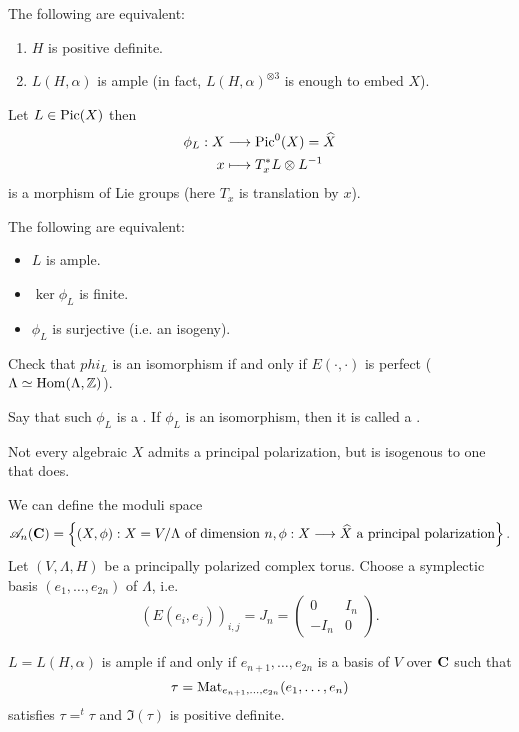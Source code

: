 \begin{theorem}[Lefschetz]
The following are equivalent:
\begin{enumerate}[1)]
\item $H$ is positive definite.
\item $L(H,\alpha)$ is ample (in fact, $L(H,\alpha)^{\otimes 3}$ is enough to embed $X$).
\end{enumerate}
\end{theorem}
Let $L\in \operatorname{Pic}(X)$ then
\begin{align*}
\phi_L: X &\longrightarrow \operatorname{Pic}^{0}(X) = \widehat{X} \\
x &\longmapsto T_x^{*}L\otimes L^{-1}
\end{align*}
is a morphism of Lie groups (here $T_x$ is translation by $x$).

\begin{theorem}
The following are equivalent:
\begin{itemize}
\item $L$ is ample.
\item $\ker\phi_L$ is finite.
\item $\phi_L$ is surjective (i.e. an isogeny).
\end{itemize}
\end{theorem}
\begin{exercise}
Check that $phi_L$ is an isomorphism if and only if $E(\cdot ,\cdot )$ is perfect
($\Lambda\simeq \operatorname{Hom}(\Lambda,\mathbb Z)$).
\end{exercise}
\begin{definition}
Say that such $\phi_L$ is a . If $\phi_L$ is an isomorphism, then it
is called a .
\end{definition}
\begin{remark}
Not every algebraic $X$ admits a principal polarization, but is isogenous to one that does.
\end{remark}
We can define the moduli space
\[
\CA_n(\C) = \left\{ (X,\phi):X = V /\Lambda\text{ of dimension }n,  \phi:X\to
\wh{X}\text{ a principal polarization} \right\}
.\]
Let $(V,\Lambda,H)$ be a principally polarized complex torus. Choose a symplectic basis
$(e_1,\dots,e_{2n})$ of $\Lambda$, i.e.
\[
(E(e_i,e_j))_{i,j} = J_n =
\begin{pmatrix} 0 & I_n \\ -I_n & 0
\end{pmatrix}
.\]
\begin{exercise}
$L=L(H,\alpha)$ is ample if and only if $e_{n+1},\dots,e_{2n}$ is a basis of $V$ over $\mathbf{C}$ such that
\[
\tau = \operatorname{Mat}_{e_{n+1},\dots,e_{2n}}(e_1,\dots,e_n)
\]
satisfies $\tau = ^{t}\tau$ and $\Im(\tau)$ is positive definite.
\end{exercise}
